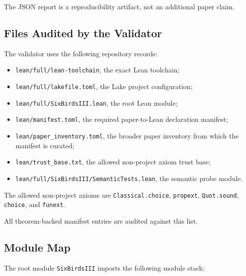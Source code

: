 \documentclass[11pt]{article}
\providecommand{\tightlist}{}
\theoremstyle{definition}
\begin{document}
The JSON report is a reproducibility artifact, not an additional paper claim.

\subsection{Files Audited by the Validator}

The validator uses the following repository records:

\begin{itemize}
\tightlist
\item
  \texttt{lean/full/lean-toolchain}, the exact Lean toolchain;
\item
  \texttt{lean/full/lakefile.toml}, the Lake project configuration;
\item
  \texttt{lean/full/SixBirdsIII.lean}, the root Lean module;
\item
  \texttt{lean/manifest.toml}, the required paper-to-Lean declaration manifest;
\item
  \texttt{lean/paper\_inventory.toml}, the broader paper inventory from which the manifest is curated;
\item
  \texttt{lean/trust\_base.txt}, the allowed non-project axiom trust base;
\item
  \texttt{lean/full/SixBirdsIII/SemanticTests.lean}, the semantic probe module.
\end{itemize}

The allowed non-project axioms are \texttt{Classical.choice}, \texttt{propext}, \texttt{Quot.sound}, \texttt{choice}, and \texttt{funext}.

All theorem-backed manifest entries are audited against this list.

\subsection{Module Map}

The root module \texttt{SixBirdsIII} imports the following module stack:
\end{document}
